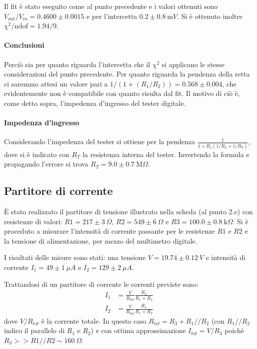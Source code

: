 \documentclass[10pt,a4paper]{article}
\newcommand\ohm{\Omega}
\newcommand\K{\text{k}}
\newcommand\M{\text{M}}
\newcommand\m{\text{m}}
\begin{document}
Il fit è stato eseguito come al punto precedente e i valori ottenuti sono $V_{out}/V_{in} = 0.4600 \pm 0.0015$ e per l'intercetta $0.2 \pm 0.8 ~ \m V$. Si è ottenuto inoltre $\chi^2 / \text{ndof} = 1.94 / 9$.

\paragraph{Conclusioni} Perciò sia per quanto riguarda l'intercetta che il $\chi^2$ si applicano le stesse considerazioni del punto precedente. Per quanto riguarda la pendenza della retta ci saremmo attesi un valore pari a  $1/(1+(R_1/R_2))=0.568 \pm 0.004$, che evidentemente non è compatibile con quanto risulta dal fit. Il motivo di ciò è, come detto sopra, l'impedenza d'ingresso del tester digitale.

\paragraph{Impedenza d'ingresso}Considerando l'impedenza del tester si ottiene per la pendenza $\frac{1}{1 + R_1 (1/R_2 + 1/R_T)}$, dove si è indicato con $R_T$ la resistenza interna del tester. Invertendo la formula e propagando l'errore si trova $R_T = 9.0 \pm 0.7 ~ \M\ohm$.

\subsection{Partitore di corrente}
È stato realizzato il partitore di tensione illustrato nella scheda (al punto 2.e) con resistenze di valori: $R1=217 \pm 3 ~\ohm$, $R2=549 \pm 6 ~ \ohm$ e $R3=100.0 \pm 0.8 ~\K\ohm$. Si è proceduto a misurare l'intensità di corrente passante per le resistenze $R1$ e $R2$ e la tensione di alimentazione, per mezzo del multimetro digitale.

I risultati delle misure sono stati: una tensione $V = 19.74 \pm 0.12~ V$ e intensità di corrente $I_1=49 \pm 1 ~\mu A$ e $I_2 = 129 \pm 2 ~ \mu A$. 

Trattandosi di un partitore di corrente le correnti previste sono:
\begin{align*}
I_1 &= \frac{V}{R_{tot}}\frac{R_2}{R_1+R_2} \\
I_2 &= \frac{V}{R_{tot}}\frac{R_1}{R_1+R_2}
\end{align*}
dove $V/R_{tot}$ è la corrente totale. In questo caso $R_{tot} = R_3 + R_1//R_2$ (con $R_1//R_2$ indico il parallelo di $R_1$ e $R_2$) e con ottima approssimazione $I_{tot}=V/R_3$ poichè $R_3 >> R1//R2 \sim 160 ~\ohm$.
\end{document}
